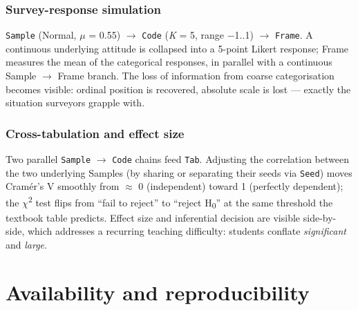 \subsubsection{Survey-response
simulation}\label{survey-response-simulation}

\texttt{Sample} (Normal, \ensuremath{\mu} = 0.55) $\rightarrow$ \texttt{Code} (\emph{K} = 5, range
$-$1..1) $\rightarrow$ \texttt{Frame}. A continuous underlying attitude is collapsed
into a 5-point Likert response; Frame measures the mean of the
categorical responses, in parallel with a continuous Sample $\rightarrow$ Frame
branch. The loss of information from coarse categorisation becomes
visible: ordinal position is recovered, absolute scale is lost ---
exactly the situation surveyors grapple with.

\subsubsection{Cross-tabulation and effect
size}\label{cross-tabulation-and-effect-size}

Two parallel \texttt{Sample} $\rightarrow$ \texttt{Code} chains feed \texttt{Tab}.
Adjusting the correlation between the two underlying Samples (by sharing
or separating their seeds via \texttt{Seed}) moves Cramér's V smoothly
from \ensuremath{\approx} 0 (independent) toward 1 (perfectly dependent); the \ensuremath{\chi}\textsuperscript{2} test flips
from ``fail to reject'' to ``reject H\textsubscript{0}'' at the same threshold the
textbook table predicts. Effect size and inferential decision are
visible side-by-side, which addresses a recurring teaching difficulty:
students conflate \emph{significant} and \emph{large}.

\section{Availability and
reproducibility}\label{availability-and-reproducibility}

